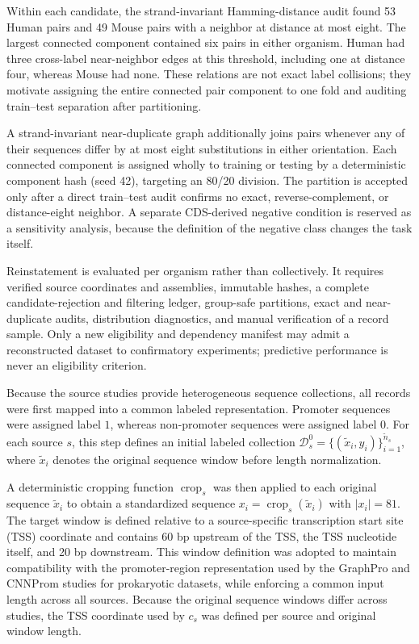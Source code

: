 Within each candidate, the strand-invariant Hamming-distance audit found 53
Human pairs and 49 Mouse pairs with a neighbor at distance at most eight. The
largest connected component contained six pairs in either organism. Human had
three cross-label near-neighbor edges at this threshold, including one at
distance four, whereas Mouse had none. These relations are not exact label
collisions; they motivate assigning the entire connected pair component to one
fold and auditing train--test separation after partitioning.

A strand-invariant near-duplicate graph additionally joins pairs whenever any of
their sequences differ by at most eight substitutions in either orientation.
Each connected component is assigned wholly to training or testing by a
deterministic component hash (seed 42), targeting an 80/20 division. The
partition is accepted only after a direct train--test audit confirms no exact,
reverse-complement, or distance-eight neighbor. A separate CDS-derived negative
condition is reserved as a sensitivity analysis,
because the definition of the negative class changes the task itself.

Reinstatement is evaluated per organism rather than collectively. It requires
verified source coordinates and assemblies, immutable hashes, a complete
candidate-rejection and filtering ledger, group-safe partitions, exact and
near-duplicate audits, distribution diagnostics, and manual verification of a
record sample. Only a new eligibility and dependency manifest may admit a
reconstructed dataset to confirmatory experiments; predictive performance is
never an eligibility criterion.

Because the source studies provide heterogeneous sequence collections, all records were first mapped into a common labeled representation. Promoter sequences were assigned label $1$, whereas non-promoter sequences were assigned label $0$. For each source $s$, this step defines an initial labeled collection $\mathcal{D}^{0}_{s}=\{(\tilde x_i,y_i)\}_{i=1}^{\tilde n_s}$, where $\tilde x_i$ denotes the original sequence window before length normalization.

A deterministic cropping function $\operatorname{crop}_s$ was then applied to each original sequence $\tilde x_i$ to obtain a standardized sequence $x_i=\operatorname{crop}_s(\tilde x_i)$ with $|x_i|=81$. The target window is defined relative to a source-specific transcription start site (TSS) coordinate and contains 60 bp upstream of the TSS, the TSS nucleotide itself, and 20 bp downstream. This window definition was adopted to maintain compatibility with the promoter-region representation used by the GraphPro and CNNProm studies for prokaryotic datasets, while enforcing a common input length across all sources. Because the original sequence windows differ across studies, the TSS coordinate used by $c_s$ was defined per source and original window length.

